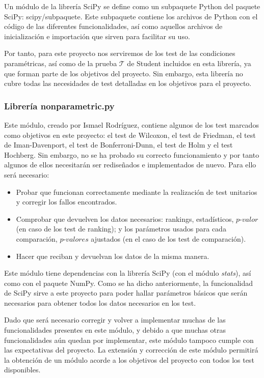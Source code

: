 Un módulo de la librería SciPy se define como un subpaquete Python del paquete SciPy: scipy/subpaquete. Este subpaquete contiene los archivos de Python con el código de las diferentes funcionalidades, así como aquellos archivos de inicialización e importación que sirven para facilitar su uso.

Por tanto, para este proyecto nos serviremos de los test de las condiciones paramétricas, así como de la prueba $\mathcal{T}$ de Student incluidos en esta librería, ya que forman parte de los objetivos del proyecto. Sin embargo, esta librería no cubre todas las necesidades de test detalladas en los objetivos para el proyecto.
 
\subsubsection{\textbf{Librería nonparametric.py}} \label{nonparametric}
Este módulo, creado por Ismael Rodríguez, contiene algunos de los test marcados como objetivos en este proyecto: el test de Wilcoxon, el test de Friedman, el test de Iman-Davenport, el test de Bonferroni-Dunn, el test de Holm y el test Hochberg. Sin embargo, no se ha probado su correcto funcionamiento y por tanto algunos de ellos necesitarán ser rediseñados e implementados de nuevo. Para ello será necesario:

\begin{itemize}
\item Probar que funcionan correctamente mediante la realización de test unitarios y corregir los fallos encontrados.
\item Comprobar que devuelven los datos necesarios: rankings, estadísticos, $\textit{p-valor}$ (en caso de los test de ranking); y los parámetros usados para cada comparación, $\textit{p-valor}es$ ajustados (en el caso de los test de comparación).
\item Hacer que reciban y devuelvan los datos de la misma manera. 
\end{itemize}

Este módulo tiene dependencias con la librería SciPy (con el módulo \textit{stats}), así como con el paquete NumPy. Como se ha dicho anteriormente, la funcionalidad de SciPy sirve a este proyecto para poder hallar parámetros básicos que serán necesarios para obtener todos los datos necesarios en los test.

Dado que será necesario corregir y volver a implementar muchas de las funcionalidades presentes en este módulo, y debido a que muchas otras funcionalidades aún quedan por implementar, este módulo tampoco cumple con las expectativas del proyecto. La extensión y corrección de este módulo permitirá la obtención de un módulo acorde a los objetivos del proyecto con todos los test disponibles. 


